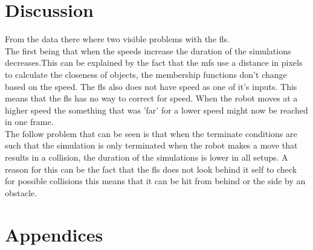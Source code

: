 \documentclass[conference]{IEEEtran}
\begin{document}
\section{Discussion}
From the data there where two visible problems with the fls.\\
The first being that when the speeds increase the duration of the simulations decreases.This can be explained by the fact that the mfs use a distance in pixels to calculate the closeness of objects, the membership functions don't change based on the speed. The fls also does not have speed as one of it's inputs. This means that the fls has no way to correct for speed. When the robot moves at a higher speed the something that was 'far' for a lower speed might now be reached in one frame.\\
The follow problem that can be seen is that when the terminate conditions are such that the simulation is only terminated when the robot makes a move that results in a collision, the duration of the simulations is lower in all setups. A reason for this can be the fact that the fls does not look behind it self to check for possible collisions this means that it can be hit from behind or the side by an obstacle.\\












\nocite{*}




\newpage

\section{Appendices}
\end{document}
